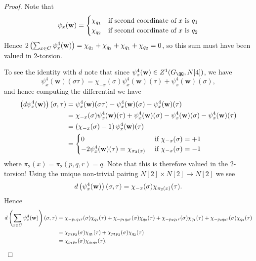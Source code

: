 \documentclass{lecturenotes}
\newcommand{\ross}[1]{{\color{red}[R:#1]}}
\newcommand{\bw}{\mathbf{w}}
\numberwithin{equation}{section}
\begin{document}
\begin{proof}
    Note that
    \[\psi_x(\bw)=\begin{cases}
        \chi_{q_1}&\textnormal{if second coordinate of }x\textnormal{ is }q_1\\
        \chi_{q_2}&\textnormal{if second coordinate of }x\textnormal{ is }q_2\\
    \end{cases}\]
    Hence $2\braces{\sum_{x\in C}\psi_x^4(\bw)}=\chi_{q_1}+\chi_{q_2}+\chi_{q_1}+\chi_{q_2}=0$, so this sum must have been valued in $2$-torsion.

    To see the identity with $d$ note that since $\psi_x^4(\bw)\in Z^1(G_\QQ,N[4])$, we have 
    \[\psi_x^4(\bw)(\sigma\tau)=\chi_{-x}(\sigma)\psi_x^4(\bw)(\tau)+\psi_{x}^4(\bw)(\sigma),\] and hence computing the differential we have
    \begin{align*}
        \braces{d\psi_x^4(\bw)}(\sigma,\tau)
        &=\psi_x^4(\bw)(\sigma\tau)-\psi_x^4(\bw)(\sigma)-\psi_x^4(\bw)(\tau)
        \\&=\chi_{-x}(\sigma)\psi_x^4(\bw)(\tau)+\psi_x^4(\bw)(\sigma)-\psi_x^4(\bw)(\sigma)-\psi_x^4(\bw)(\tau)
        \\&=\braces{\chi_{-x}(\sigma)-1}\psi_x^4(\bw)(\tau)
        \\&=\begin{cases}
            0&\textnormal{ if }\chi_{-x}(\sigma)=+1\\
            -2\psi_x^4(\bw)(\tau)=\chi_{\pi_2(x)}&\textnormal{ if }\chi_{-x}(\sigma)=-1
        \end{cases}
    \end{align*}
    where $\pi_2(x)=\pi_2(p,q,r)=q$.  Note that this is therefore valued in the $2$-torsion!  Using the unique non-trivial pairing $N[2]\times N[2]\to N[2]$ we see 
    \[d\braces{\psi_x^4(\bw)}(\sigma,\tau)=\chi_{-x}(\sigma)\chi_{\pi_2(x)}(\tau).\]
    Hence 
    \begin{align*}
        d\braces{\sum_{x\in C}\psi_x^4(\bw)}(\sigma,\tau)
        &=\chi_{-p_1q_1r}(\sigma)\chi_{q_1}(\tau)+\chi_{-p_1q_2r}(\sigma)\chi_{q_2}(\tau)
        +\chi_{-p_2q_1r}(\sigma)\chi_{q_1}(\tau)+\chi_{-p_2q_2r}(\sigma)\chi_{q_2}(\tau)\\
        &=\chi_{p_1p_2}(\sigma)\chi_{q_1}(\tau)+\chi_{p_1p_2}(\sigma)\chi_{q_2}(\tau)\\
        &=\chi_{p_1p_2}(\sigma)\chi_{q_1q_2}(\tau).
    \end{align*}
\end{proof}
\lecture{}{}
\end{document}
